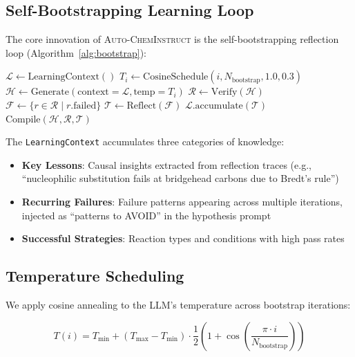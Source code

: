 \documentclass{article}
\begin{document}
\subsection{Self-Bootstrapping Learning Loop}

The core innovation of \textsc{Auto-ChemInstruct} is the self-bootstrapping reflection loop (Algorithm~\ref{alg:bootstrap}):

\begin{algorithm}[t]
\caption{Self-Bootstrapping Pipeline}
\label{alg:bootstrap}
\begin{algorithmic}[1]
\State $\mathcal{L} \gets \text{LearningContext}()$ 
    \State $T_i \gets \text{CosineSchedule}(i, N_{\text{bootstrap}}, 1.0, 0.3)$
    \State $\mathcal{H} \gets \text{Generate}(\text{context}=\mathcal{L}, \text{temp}=T_i)$
    \State $\mathcal{R} \gets \text{Verify}(\mathcal{H})$
    \State $\mathcal{F} \gets \{r \in \mathcal{R} \mid r.\text{failed}\}$
        \State $\mathcal{T} \gets \text{Reflect}(\mathcal{F})$
        \State $\mathcal{L}.\text{accumulate}(\mathcal{T})$ 
    \EndIf
\EndFor
\State \Return $\text{Compile}(\mathcal{H}, \mathcal{R}, \mathcal{T})$
\end{algorithmic}
\end{algorithm}

The \texttt{LearningContext} accumulates three categories of knowledge:
\begin{itemize}
    \item \textbf{Key Lessons}: Causal insights extracted from reflection traces (e.g., ``nucleophilic substitution fails at bridgehead carbons due to Bredt's rule'')
    \item \textbf{Recurring Failures}: Failure patterns appearing across multiple iterations, injected as ``patterns to AVOID'' in the hypothesis prompt
    \item \textbf{Successful Strategies}: Reaction types and conditions with high pass rates
\end{itemize}

\subsection{Temperature Scheduling}

We apply cosine annealing to the LLM's temperature across bootstrap iterations:

\begin{equation}
T(i) = T_{\text{min}} + (T_{\text{max}} - T_{\text{min}}) \cdot \frac{1}{2}\left(1 + \cos\left(\frac{\pi \cdot i}{N_{\text{bootstrap}}}\right)\right)
\end{equation}
\end{document}
